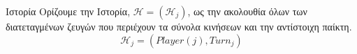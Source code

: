 {}
\begin{definitiongr}{Ιστορία}
  Ορίζουμε την Ιστορία, $\mathcal{H} = \left(\mathcal{H}_j\right)$, ως την ακολουθία όλων των διατεταγμένων ζευγών που
  περιέχουν τα σύνολα κινήσεων και την αντίστοιχη παίκτη.
  \begin{equation}
    \mathcal{H}_j = \left(Player\left(j\right), Turn_j\right)
  \end{equation}
\end{definitiongr}
